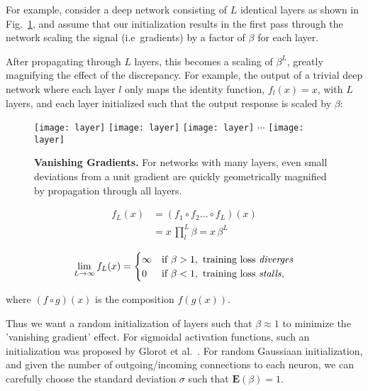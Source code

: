 \documentclass[thesis]{subfiles}
\begin{document}
For example, consider a deep network consisting of $L$ identical layers as shown in Fig.~\ref{fig:manylayers}, and assume that our initialization results in the first pass through the network scaling the signal (i.e~gradients) by a factor of $\beta$ for each layer.

After propagating through $L$ layers, this becomes a scaling of $\beta^L$, greatly magnifying the effect of the discrepancy. For example, the output of a trivial deep network  where each layer $l$ only maps the identity function, $f_{l}(x) = x$, with $L$ layers, and each layer initialized such that the output response is scaled by $\beta$:

\begin{figure}[tbp]
	\texttt{[image: layer]}
	\texttt{[image: layer]}
	\texttt{[image: layer]}
	$\cdots$
	\texttt{[image: layer]}
	\caption[Vanishing Gradients]{\textbf{Vanishing Gradients.} For networks with many layers, even small deviations from a unit gradient are quickly geometrically magnified by propagation through all layers.}
	\label{fig:manylayers}
\end{figure}
\begin{equation}
\begin{aligned}
	f_L(x) & = (f_1 \circ f_2 \ldots \circ f_L) (x)\\
	& = x \, \prod^{L}_{l} \beta = x\, \beta^L
\end{aligned}
\end{equation}

\[
\lim_{L\to\infty} f_L(x) = 
\begin{cases}
\infty & \text{if } \beta > 1, \text{ training loss \emph{diverges}}\\
0 & \text{if } \beta < 1, \text{ training loss \emph{stalls}},
\end{cases}
\]

where $(f \circ g)(x)$ is the composition $f(g(x))$.

Thus we want a random initialization of layers such that $\beta\approx 1$ to minimize the 'vanishing gradient' effect. For sigmoidal activation functions, such an initialization was proposed by Glorot et al.~\cite{glorot2010understanding}. For random Gaussiaan initialization, and given the number of outgoing/incoming connections to each neuron, we can carefully choose the standard deviation $\sigma$ such that $\mathbf{E}(\beta) = 1$. 
\end{document}
